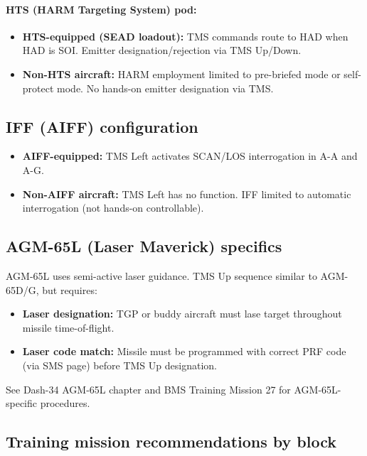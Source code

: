 \documentclass[11pt, a4paper, twoside]{report}
\begin{document}
\paragraph{HTS (HARM Targeting System) pod:}
\begin{itemize}
    \item \textbf{HTS-equipped (SEAD loadout):} TMS commands route to HAD when HAD is SOI. Emitter designation/rejection via TMS Up/Down.
    \item \textbf{Non-HTS aircraft:} HARM employment limited to pre-briefed mode or self-protect mode. No hands-on emitter designation via TMS.
\end{itemize}

\subsection{IFF (AIFF) configuration}
\label{sec:C3-S6-S2}

\begin{itemize}
    \item \textbf{AIFF-equipped:} TMS Left activates SCAN/LOS interrogation in A-A and A-G.
    \item \textbf{Non-AIFF aircraft:} TMS Left has no function. IFF limited to automatic interrogation (not hands-on controllable).
\end{itemize}

\subsection{AGM-65L (Laser Maverick) specifics}
\label{sec:C3-S6-S3}

AGM-65L uses semi-active laser guidance. TMS Up sequence similar to AGM-65D/G, but requires:
\begin{itemize}
    \item \textbf{Laser designation:} TGP or buddy aircraft must lase target throughout missile time-of-flight.
    \item \textbf{Laser code match:} Missile must be programmed with correct PRF code (via SMS page) before TMS Up designation.
\end{itemize}

See Dash-34 AGM-65L chapter and BMS Training Mission 27 for AGM-65L-specific procedures.

\subsection{Training mission recommendations by block}
\label{sec:C3-S6-S4}
\end{document}
